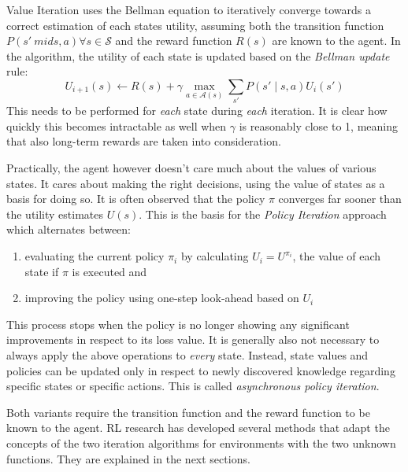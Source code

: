 Value Iteration uses the Bellman equation to iteratively converge towards a correct estimation of each states utility,
assuming both the transition function $P(s' \ mid s,a) \forall s \in \mathcal{S}$ and the reward function $R(s)$ are
known to the agent.
In the algorithm, the utility of each state is updated based on the \emph{Bellman update} rule:
\begin{equation}
    U_{i+1}(s) \gets R(s) + \gamma \max_{a \in \mathcal{A}(s)} \sum_{s'}{P(s' \mid s,a) U_i(s')}
\end{equation}
This needs to be performed for \emph{each} state during \emph{each} iteration. It is clear how quickly this becomes
intractable as well when $\gamma$ is reasonably close to 1, meaning that also long-term rewards are taken into
consideration.

Practically, the agent however doesn't care much about the values of various states. It cares about making the right
decisions, using the value of states as a basis for doing so. It is often observed that the policy $\pi$ converges far
sooner than the utility estimates $U(s)$. This is the basis for the \emph{Policy Iteration} approach which alternates
between:
\begin{enumerate}
    \item evaluating the current policy $\pi_i$ by calculating $U_i=U^{\pi_i}$, the value of each state if $\pi$ is
        executed and
    \item improving the policy using one-step look-ahead based on $U_i$
\end{enumerate}

This process stops when the policy is no longer showing any significant improvements in respect to its loss value. It is
generally also not necessary to always apply the above operations to \emph{every} state. Instead, state values and
policies can be updated only in respect to newly discovered knowledge regarding specific states or specific actions.
This is called \emph{asynchronous policy iteration}.

Both variants require the transition function and the reward function to be known to the agent. \ac{RL} research has
developed several methods that adapt the concepts of the two iteration algorithms for environments with the two unknown
functions. They are explained in the next sections.

